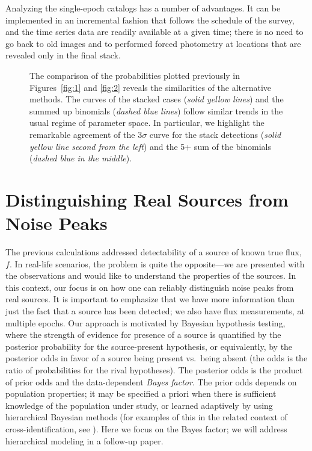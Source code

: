 \documentclass[twocolumn]{emulateapj}
\newcommand\enote[1]{ {\color{red}%
\marginpar[\raggedleft\large $\blacktriangleright$]%
{\raggedright\large $\blacktriangleleft$} %
{\large $\langle\langle\langle$}{\sl #1}{\large  $\rangle\rangle\rangle$} }}
\newcommand\tamas[1]{{\color{blue}#1 [Tamas]}}
\begin{document}

Analyzing the single-epoch catalogs has a number of advantages.
It can be implemented in an incremental fashion that follows the schedule of the survey, and the time series data are readily available at a given time; there is no need to go back to old images and to performed forced photometry at locations that are revealed only in the final stack.

\begin{figure}[t]
\caption{The comparison of the probabilities plotted previously in Figures~\ref{fig:1} and \ref{fig:2} reveals the similarities of the alternative methods. The curves of the stacked cases ({\it{}solid yellow lines}) and the summed up binomials ({\it{}dashed blue lines}) follow similar trends in the usual regime of parameter space. In particular, we highlight the remarkable agreement of the 3$\sigma$ curve for the stack detections ({\it{}solid yellow line second from the left}) and the 5+ sum of the binomials ({\it{}dashed blue in the middle}).}
\label{fig:3}
\end{figure}


\section{Distinguishing Real Sources from Noise Peaks}
\noindent
%
The previous calculations addressed detectability of a source of known true flux, $f$.
In real-life scenarios, the problem is quite the opposite---we are presented with the observations and would like to understand the properties of the sources. 
In this context, our focus is on how one can reliably distinguish noise peaks from real sources. 
It is important to emphasize that we have more information than just the fact that a source has been detected; we also have flux measurements, at multiple epochs. 
Our approach is motivated by Bayesian hypothesis testing, where the strength of evidence for presence of a source is quantified by the posterior probability for the source-present hypothesis, or equivalently, by the posterior odds in favor of a source being present vs.\ being absent (the odds is the ratio of probabilities for the rival hypotheses).
The posterior odds is the product of prior odds and the data-dependent \emph{Bayes factor}.
The prior odds depends on population properties; it may be specified a priori when there is sufficient knowledge of the population under study, or learned adaptively by using hierarchical Bayesian methods (for examples of this in the related context of cross-identification, see \cite{B12-SCMAXMatch,L12-HierXMatch}).
Here we focus on the Bayes factor; we will address hierarchical modeling in a follow-up paper.
\end{document}
